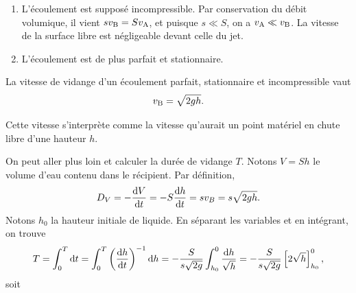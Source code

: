 \documentclass[12pt,fancy]{cours}
\begin{document}
\begin{enumerate}
  \item L'écoulement est supposé incompressible. Par conservation du débit volumique, il vient $sv_{\rm{B}}=Sv_{\rm{A}}$, et puisque $s \ll S$, on a $v_{\rm{A}}\ll v_{\rm{B}}$. La vitesse de la surface libre est négligeable devant celle du jet.
  \item L'écoulement est de plus parfait et stationnaire.
\end{enumerate}
\begin{theorem}\label{form:torricelli}
  La vitesse de vidange d’un écoulement parfait, stationnaire et incompressible vaut
$$
v_{\rm{B}}=\sqrt{2gh}.
$$
\end{theorem}
\begin{remarque}
  Cette vitesse s'interprète comme la vitesse qu'aurait un point matériel en chute libre d'une hauteur $h$.
\end{remarque}



On peut aller plus loin et calculer la durée de vidange $T$. Notons $V=Sh$ le volume d'eau contenu dans le récipient. Par définition,
\begin{equation}
D_V = -\frac{\mathrm{d}{V}}{\mathrm{d}{t}} = -S\dfrac{\mathrm{d}h}{\mathrm{d}t}= sv_B = s\sqrt{2gh}.
\end{equation}
Notons $h_0$ la hauteur initiale de liquide. En séparant les variables et en intégrant, on trouve
\begin{equation}
T = \int_{0}^{T}\mathrm{d}t = \int_{0}^{T}\left(\frac{\mathrm{d}{h}}{\mathrm{d}{t}}\right)^{-1} \mathrm{d} h =-\dfrac{S}{s\sqrt{2g}}\int_{h_{0}}^{0}\dfrac{\mathrm{d}h}{\sqrt{h}}=-\dfrac{S}{s\sqrt{2g}}\left[2\sqrt{h}\right]^{0}_{h_{0}},
\end{equation}
soit 
\end{document}
